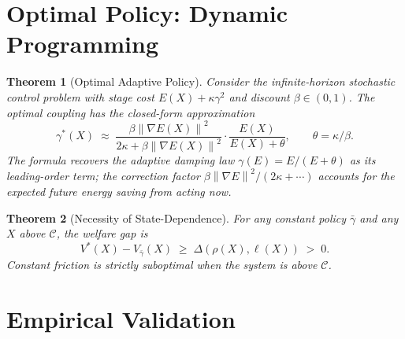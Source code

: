 \documentclass[11pt]{article}
\newtheorem{theorem}{Theorem}[section]
\theoremstyle{definition}
\newcommand{\grad}{\nabla}
\newcommand{\Cman}{\mathcal{C}}
\newcommand{\norm}[1]{\left\|#1\right\|}
\begin{document}

\section{Optimal Policy: Dynamic Programming}
\label{sec:policy}


\begin{theorem}[Optimal Adaptive Policy]
\label{thm:or2}
Consider the infinite-horizon stochastic control problem with stage cost
$E(X) + \kappa\gamma^2$ and discount $\beta\in(0,1)$.  The optimal coupling
has the closed-form approximation
\[
  \gamma^*(X)
  \;\approx\;
  \frac{\beta\norm{\grad E(X)}^2}{2\kappa + \beta\norm{\grad E(X)}^2}
  \cdot
  \frac{E(X)}{E(X) + \theta},
  \qquad
  \theta = \kappa/\beta.
\]
The formula recovers the adaptive damping law $\gamma(E) = E/(E+\theta)$ as its
leading-order term; the correction factor $\beta\norm{\grad E}^2/(2\kappa+\cdots)$
accounts for the expected future energy saving from acting now.
\end{theorem}

\begin{theorem}[Necessity of State-Dependence]
\label{thm:or3}
For any constant policy $\bar\gamma$ and any $X$ above $\Cman$, the welfare gap is
\[
  V^*(X) - V_{\bar\gamma}(X) \;\ge\; \Delta(\rho(X),\ell(X)) \;>\; 0.
\]
Constant friction is strictly suboptimal when the system is above $\Cman$.
\end{theorem}

\section{Empirical Validation}
\label{sec:empirical}

\end{document}
